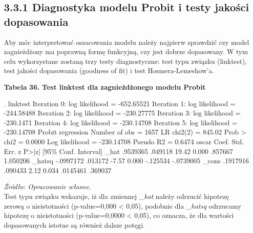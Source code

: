\subsection*{3.3.1 Diagnostyka modelu Probit i testy jakości dopasowania}
\vspace{0.5cm}

Aby móc interpretować oszacowania modelu należy najpierw sprawdzić czy model zagnieżdżony ma poprawną formę funkcyjną, czy jest dobrze dopasowany. W tym celu wykorzystane zostaną trzy testy diagnostyczne: test typu związku (linktest), test jakości dopasowania (goodness of fit) i test Hosmera-Lemeshow'a.

\vspace{0.5cm}
\textbf{Tabela 36. Test linktest dla zagnieżdżonego modelu Probit}
\begin{stlog}
. linktest
{\smallskip}
Iteration 0:   log likelihood = -652.65521  
Iteration 1:   log likelihood = -244.58488  
Iteration 2:   log likelihood = -230.27775  
Iteration 3:   log likelihood =  -230.1471  
Iteration 4:   log likelihood = -230.14708  
Iteration 5:   log likelihood = -230.14708  
{\smallskip}
Probit regression                                 Number of obs   =       1657
                                                  LR chi2(2)      =     845.02
                                                  Prob > chi2     =     0.0000
Log likelihood = -230.14708                       Pseudo R2       =     0.6474
{\smallskip}
\vspace{0.5cm}
       oscar {\VBAR}      Coef.   Std. Err.      z    P>|z|     [95\% Conf. Interval]
        _hat {\VBAR}   .9539365    .049118    19.42   0.000      .857667    1.050206
      _hatsq {\VBAR}  -.0997172    .013172    -7.57   0.000     -.125534   -.0739005
       _cons {\VBAR}   .1917916    .090433     2.12   0.034     .0145461     .369037
\end{stlog}
\textit{\footnotesize{Źródło: Opracowanie własne.}} \\

Test typu związku wskazuje, iż dla zmiennej \textit{_hat} należy odrzucić hipotezę zerową o nieistotności (p-value=0,000 < 0,05), podobnie dla \textit{_hatsq} odrzucamy hipotezę o nieistotności (p-value=0,0000 < 0,05), co oznacza, że dla wartości dopasowanych istotne są również dalsze potęgi. 

